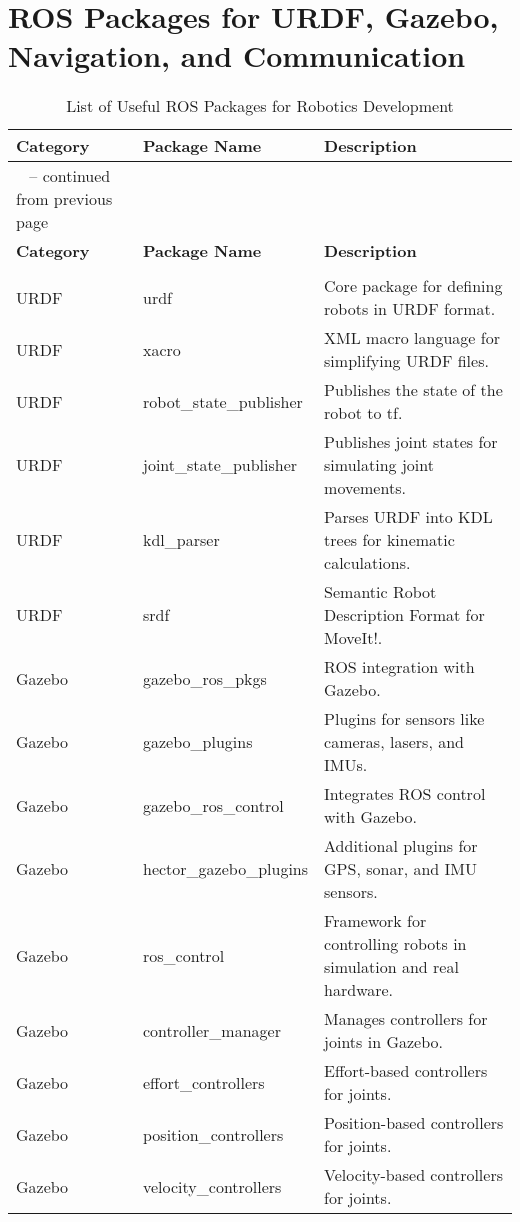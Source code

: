 \documentclass[../../main]{subfiles}
\begin{document}
\section*{ROS Packages for URDF, Gazebo, Navigation, and Communication}

\begin{longtable}{|>{\centering\arraybackslash}p{4cm}|>{\centering\arraybackslash}p{4cm}|p{6cm}|}
\caption{List of Useful ROS Packages for Robotics Development} \label{tab:ros_packages} \\

\hline \rowcolor{red!20} 
\textbf{Category} & \textbf{Package Name} & \textbf{Description} \\
\hline
\endfirsthead

\multicolumn{3}{c}%
{{\tablename\ \thetable{} -- continued from previous page}} \\
\hline \rowcolor{red!20} 
\textbf{Category} & \textbf{Package Name} & \textbf{Description} \\
\hline
\endhead

\hline 
\multicolumn{3}{r}{{Continued on next page}} \\
\endfoot

\hline
\endlastfoot

URDF & urdf & Core package for defining robots in URDF format. \\
URDF & xacro & XML macro language for simplifying URDF files. \\
URDF & robot\_state\_publisher & Publishes the state of the robot to tf. \\
URDF & joint\_state\_publisher & Publishes joint states for simulating joint movements. \\
URDF & kdl\_parser & Parses URDF into KDL trees for kinematic calculations. \\
URDF & srdf & Semantic Robot Description Format for MoveIt!. \\

Gazebo & gazebo\_ros\_pkgs & ROS integration with Gazebo. \\
Gazebo & gazebo\_plugins & Plugins for sensors like cameras, lasers, and IMUs. \\
Gazebo & gazebo\_ros\_control & Integrates ROS control with Gazebo. \\
Gazebo & hector\_gazebo\_plugins & Additional plugins for GPS, sonar, and IMU sensors. \\
Gazebo & ros\_control & Framework for controlling robots in simulation and real hardware. \\
Gazebo & controller\_manager & Manages controllers for joints in Gazebo. \\
Gazebo & effort\_controllers & Effort-based controllers for joints. \\
Gazebo & position\_controllers & Position-based controllers for joints. \\
Gazebo & velocity\_controllers & Velocity-based controllers for joints. \\


\end{longtable}
\end{document}
